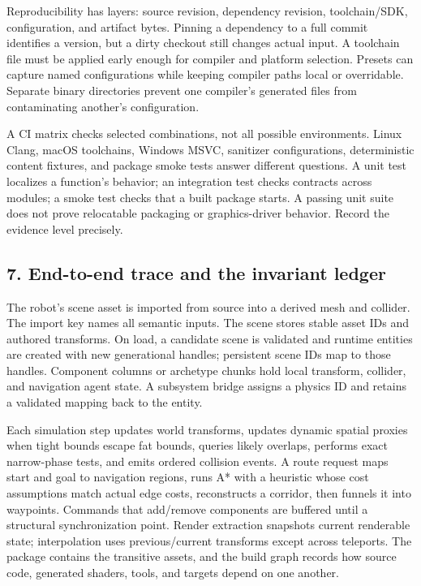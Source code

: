 Reproducibility has layers: source revision, dependency revision, toolchain/SDK, configuration, and artifact bytes. Pinning a dependency to a full commit identifies a version, but a dirty checkout still changes actual input. A toolchain file must be applied early enough for compiler and platform selection. Presets can capture named configurations while keeping compiler paths local or overridable. Separate binary directories prevent one compiler's generated files from contaminating another's configuration.

A CI matrix checks selected combinations, not all possible environments. Linux Clang, macOS toolchains, Windows MSVC, sanitizer configurations, deterministic content fixtures, and package smoke tests answer different questions. A unit test localizes a function's behavior; an integration test checks contracts across modules; a smoke test checks that a built package starts. A passing unit suite does not prove relocatable packaging or graphics-driver behavior. Record the evidence level precisely.

\subsection{7. End-to-end trace and the invariant ledger}\label{05-engine-i-ch008-end-to-end-trace-and-the-invariant-ledger}

\hypertarget{05-engine-i-ch008-end-to-end-trace-and-the-invariant-ledger}{}

The robot's scene asset is imported from source into a derived mesh and collider. The import key names all semantic inputs. The scene stores stable asset IDs and authored transforms. On load, a candidate scene is validated and runtime entities are created with new generational handles; persistent scene IDs map to those handles. Component columns or archetype chunks hold local transform, collider, and navigation agent state. A subsystem bridge assigns a physics ID and retains a validated mapping back to the entity.

Each simulation step updates world transforms, updates dynamic spatial proxies when tight bounds escape fat bounds, queries likely overlaps, performs exact narrow-phase tests, and emits ordered collision events. A route request maps start and goal to navigation regions, runs A* with a heuristic whose cost assumptions match actual edge costs, reconstructs a corridor, then funnels it into waypoints. Commands that add/remove components are buffered until a structural synchronization point. Render extraction snapshots current renderable state; interpolation uses previous/current transforms except across teleports. The package contains the transitive assets, and the build graph records how source code, generated shaders, tools, and targets depend on one another.

